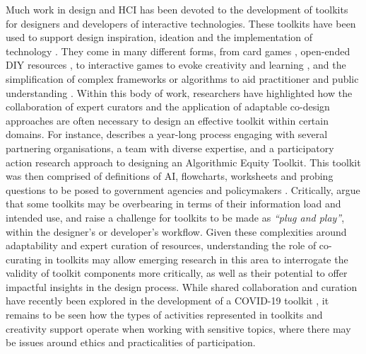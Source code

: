 Much work in design and HCI has been devoted to the development of toolkits for designers and developers of interactive technologies. These toolkits have been used to support design inspiration, ideation and the implementation of technology \citep{jarusriboonchai2018thinking}. They come in many different forms, from card games \citep{mora2017tiles}, open-ended DIY resources \citep{meissner_-it-yourself_2017}, to interactive games to evoke creativity and learning \citep{ellis2021tapeblocks}, and the simplification of complex frameworks or algorithms to aid practitioner and public understanding \citep{lee2021landscape}. Within this body of work, researchers have highlighted how the collaboration of expert curators and the application of adaptable co-design approaches are often necessary to design an effective toolkit within certain domains. For instance, \cite{krafft2021action} describes a year-long process engaging with several partnering organisations, a team with diverse expertise, and a participatory action research approach to designing an Algorithmic Equity Toolkit. This toolkit was then comprised of definitions of AI, flowcharts, worksheets and probing questions to be posed to government agencies and policymakers \citep{katell2020toward}. Critically, \cite{lee2021landscape} argue that some toolkits may be overbearing in terms of their information load and intended use, and raise a challenge for toolkits to be made as \textit{``plug and play''}, within the designer's or developer’s workflow. Given these complexities around adaptability and expert curation of resources, understanding the role of co-curating in toolkits may allow emerging research in this area to interrogate the validity of toolkit components more critically, as well as their potential to offer impactful insights in the design process. While shared collaboration and curation have recently been explored in the development of a COVID-19 toolkit \citep{braybrooke2020together}, it remains to be seen how the types of activities represented in toolkits and creativity support operate when working with sensitive topics, where there may be issues around ethics and practicalities of participation. 

